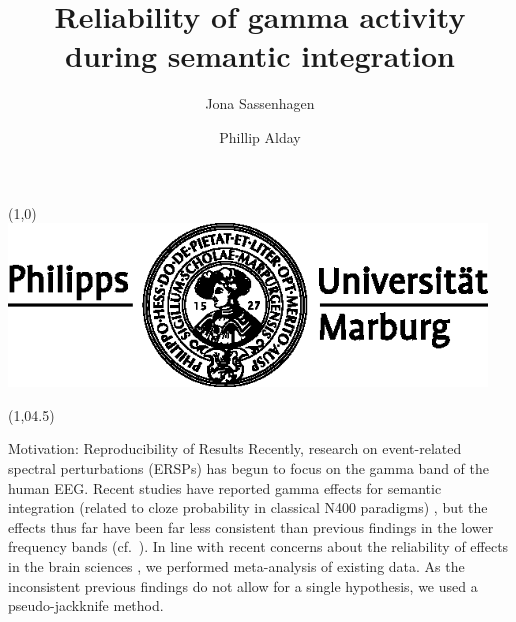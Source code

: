 \documentclass[final]{beamer}
\title{Reliability of gamma activity during semantic integration}
\author{Jona Sassenhagen \and Phillip Alday}
\institute{University of Marburg}
\date{}
\begin{document}
\begin{frame}{} 	
\begin{textblock}{15}(1,0)
\includegraphics[width=5in]{marburg-logo-blackwhite.eps}
\end{textblock}


\begin{textblock}{45}(1,04.5)
\begin{block}{Motivation: Reproducibility of Results}
Recently, research on event-related spectral perturbations (ERSPs) has begun to focus on the gamma band of the human EEG. Recent studies have reported gamma effects for semantic integration (related to cloze probability in classical N400 paradigms) \cite{mellemfriedmanmedvedev2013a,wangzhubastiaansen2012a,penolazziangrillijob2009a,hagoort2008a,hagoorthaldbastiaansen2004a}, but the effects thus far have been far less consistent than previous findings in the lower frequency bands (cf.~\cite{bastiaansenhagoort2006a,heinetammhofmann2006a,rohmklimeschhaider2001a,davidsonindefrey2007a,roehmschlesewskybornkessel2004a}).
In line with recent concerns about the reliability of effects in the brain sciences \cite{vulharriswinkielman2009a,simmonsnelsonsimonsohn2011a,kilner2013a}, we performed meta-analysis of existing data. As the inconsistent previous findings do not allow for a single hypothesis, we used a pseudo-jackknife method.
\end{block}


\end{textblock}
\end{frame}
\end{document}
